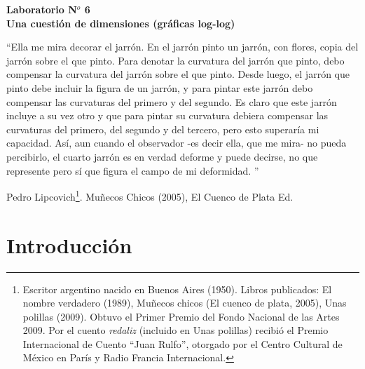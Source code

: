 \documentclass[10pt,a4paper]{article}
\numberwithin{equation}{section}
\begin{document}
\begin{center}
{
\begin{large}
\textbf{Laboratorio N$^o$ 6} \\
\vspace*{0.1cm}
\textbf{Una cuestión de dimensiones \linebreak (gráficas log-log)}

\end{large}
}
\end{center}





\medskip

\begin{flushright}
\begin{scriptsize}

``Ella me mira decorar el jarrón. En el jarrón pinto un jarrón, con flores, copia del jarrón sobre el que pinto. Para denotar la curvatura del jarrón que pinto, debo compensar la curvatura del jarrón sobre el que pinto. Desde luego, el jarrón que pinto debe incluir la figura de un jarrón, y para pintar este jarrón debo compensar las curvaturas del primero y del segundo. Es claro que este jarrón incluye a su vez otro y que para pintar su curvatura debiera compensar las curvaturas del primero, del segundo y del tercero, pero esto superaría mi capacidad. Así, aun cuando el observador -es decir ella, que me mira- no pueda percibirlo, el cuarto jarrón es en verdad deforme y puede decirse, no que represente pero sí que figura el campo de mi deformidad. ''


Pedro Lipcovich\footnote{Escritor argentino nacido en Buenos Aires (1950). Libros publicados: El nombre verdadero (1989), Muñecos chicos (El cuenco de plata, 2005), Unas polillas (2009). Obtuvo el Primer Premio del Fondo Nacional de las Artes 2009. Por el cuento \textit{redaliz} (incluido en Unas polillas) recibió el Premio Internacional de Cuento ``Juan Rulfo'', otorgado por el Centro Cultural de México en París y Radio Francia Internacional.}. Muñecos Chicos (2005), El Cuenco de Plata Ed. 

\end{scriptsize}
\end{flushright}

\section{Introducción}
\end{document}
